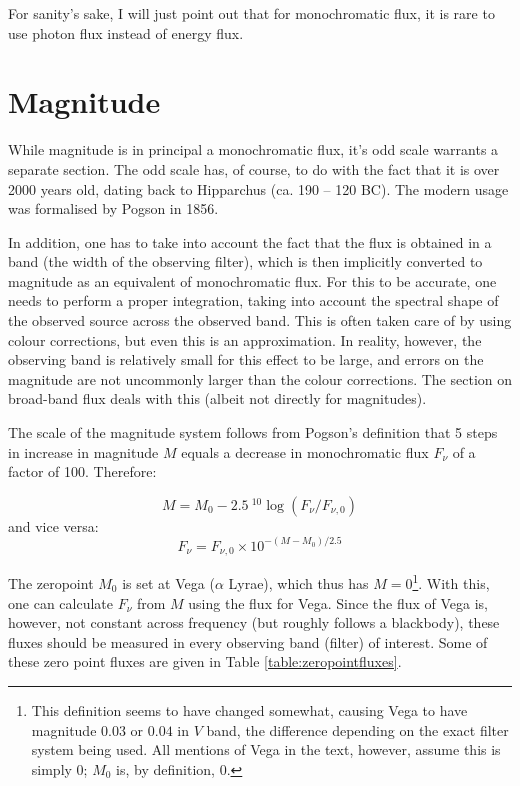\documentclass[12pt,a4paper]{article}
\newcommand{\fv}{\ensuremath{F_{\nu}}}
\newcommand{\fvz}{\ensuremath{F_{\nu, 0}}}
\begin{document}
For sanity's sake, I will just point out that for monochromatic flux, it is rare to use photon flux instead of energy flux.





\section*{Magnitude}

While magnitude is in principal a monochromatic flux, it's odd scale warrants a separate section. The odd scale has, of course, to do with the fact that it is over 2000 years old, dating back to Hipparchus (ca. 190 -- 120 BC). The modern usage was formalised by Pogson in 1856.

In addition, one has to take into account the fact that the flux is obtained in a band (the width of the observing filter), which is then implicitly converted to magnitude as an equivalent of monochromatic flux. For this to be accurate, one needs to perform a proper integration, taking into account the spectral shape of the observed source across the observed band. This is often taken care of by using colour corrections, but even this is an approximation. In reality, however, the observing band is relatively small for this effect to be large, and errors on the magnitude are not uncommonly larger than the colour corrections. The section on broad-band flux deals with this (albeit not directly for magnitudes).

The scale of the magnitude system follows from Pogson's definition that 5 steps in increase in magnitude $M$ equals a decrease in monochromatic flux $\fv$ of a factor of 100. Therefore:

\begin{equation*}
M = M_0 - 2.5\ {}^{10}\!\log \left( \fv / \fvz \right)
\end{equation*}
and vice versa:
\begin{equation*}
\fv = \fvz \times 10^{- \left( M - M_0 \right) / 2.5}
\end{equation*}

The zeropoint $M_0$ is set at Vega ($\alpha$ Lyrae), which thus has $M = 0$\footnote{This definition seems to have changed somewhat, causing Vega to have magnitude $0.03$ or $0.04$ in $V$ band, the difference depending on the exact filter system being used. All mentions of Vega in the text, however, assume this is simply 0; $M_0$ is, by definition, 0.}. With this, one can calculate $\fv$ from $M$ using the flux for Vega. Since the flux of Vega is, however, not constant across frequency (but roughly follows a blackbody), these fluxes should be measured in every observing band (filter) of interest. Some of these zero point fluxes are given in Table \ref{table:zeropointfluxes}.
\end{document}
